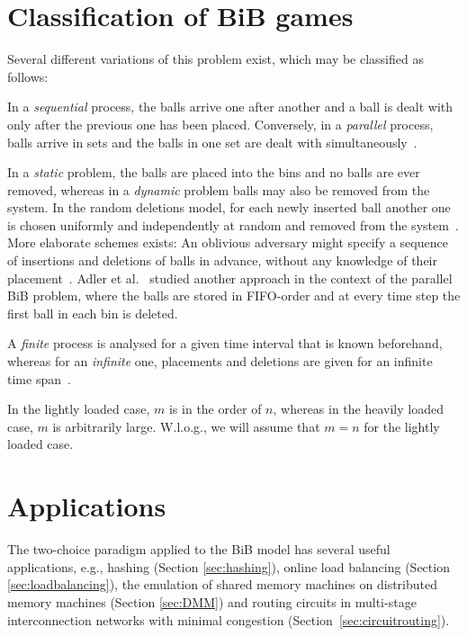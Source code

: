 \documentclass[a4paper,12pt]{article}
\begin{document}
\section{Classification of BiB games}
\label{sec:classification}
Several different variations of this problem exist, which may be classified as follows:
\begin{compactitem}
\item In a \emph{sequential} process, the balls arrive one after another and a ball is dealt with only after the previous one has been placed. Conversely, in a \emph{parallel} process, balls arrive in sets and the balls in one set are dealt with simultaneously~\cite{ABS98}. 
\item In a \emph{static} problem, the balls are placed into the bins and no balls are ever removed, whereas in a \emph{dynamic} problem balls may also be removed from the system. In the random deletions model, for each newly inserted ball another one is chosen uniformly and independently at random and removed from the system~\cite{ABKU99, MRS01}. More elaborate schemes exists: An oblivious adversary might specify a sequence of insertions and deletions of balls in advance, without any knowledge of their placement~\cite{CFM+98}. Adler et al.~\cite{ABS98} studied another approach in the context of the parallel BiB problem, where the balls are stored in FIFO-order and at every time step the first ball in each bin is deleted. 
\item A \emph{finite} process is analysed for a given time interval that is known beforehand, whereas for an \emph{infinite} one, placements and deletions are given for an infinite time span~\cite{ABS98}.
\item In the lightly loaded case, $m$ is in the order of $n$, whereas in the heavily loaded case, $m$ is arbitrarily large. W.l.o.g., we will assume that $m = n$ for the lightly loaded case. 
\end{compactitem}

\section{Applications}
\label{sec:applications}
The two-choice paradigm applied to the BiB model has several useful applications, e.g., hashing (Section \ref{sec:hashing}), online load balancing (Section \ref{sec:loadbalancing}), the emulation of shared memory machines on distributed memory machines (Section \ref{sec:DMM}) and routing circuits in multi-stage interconnection networks with minimal congestion (Section~\ref{sec:circuitrouting}).
\end{document}
